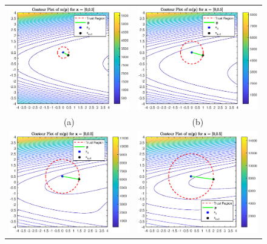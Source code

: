 \documentclass[a4paper,11pt]{article}
\begin{document}
\begin{figure}[!ht]
	\centering
	\begin{tabular}{cc}
		\includegraphics[width=.55\textwidth]{Trust_x1_Dk0p5} &\hspace{-25pt} \includegraphics[width=.55\textwidth]{Trust_x1_Dk1} \\
		(a) & (b)\\
		\includegraphics[width=.55\textwidth]{Trust_x1_Dk1p5} &\hspace{-25pt} \includegraphics[width=.55\textwidth]{Trust_x1_Dk2} \\

\end{tabular}
\end{figure}
\end{document}
